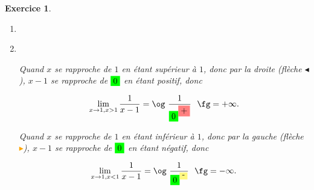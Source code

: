 \documentclass[10pt]{article}
\newtheorem{exo}{Exercice}
\newcommand\setItemnumber[1]{\setcounter{enumi}{\numexpr#1-1\relax}}
\begin{document}
\begin{exo}

~{}


\begin{enumerate}
\setItemnumber{1}
\item \item ~{}

\begin{center}
\newcommand*{\z}{\colorbox{green}{$0$}}
\end{center}

\setlength{\columnseprule}{1pt}
\begin{multicols}{2}


Quand $x$ se rapproche de $1$ en étant supérieur à $1$, donc par la droite (flèche \textcolor{blue!50!black}{$\blacktriangleleft$}), $x-1$ se rapproche de $\colorbox{green}{0}$ en étant \colorbox{red!50}{positif}, donc

\[\lim\limits_{x\to 1,x>1}\frac{1}{x-1}=\text{\og}~\frac{1}{\colorbox{green}{0}^{\colorbox{red!50}{+}}}~\text{ \fg}=+\infty.\]





\columnbreak


Quand $x$ se rapproche de $1$ en étant inférieur à $1$, donc par la gauche (flèche \textcolor{orange}{$\blacktriangleright$}), $x-1$ se rapproche de $\colorbox{green}{0}$ en étant \colorbox{yellow!50}{négatif}, donc

\[\lim\limits_{x\to 1,x<1}\frac{1}{x-1}=\text{\og}~\frac{1}{\colorbox{green}{0}^{\colorbox{yellow!50}{-}}}~\text{ \fg}=-\infty.\]
\end{multicols}
\end{enumerate}


\end{exo}
\end{document}
